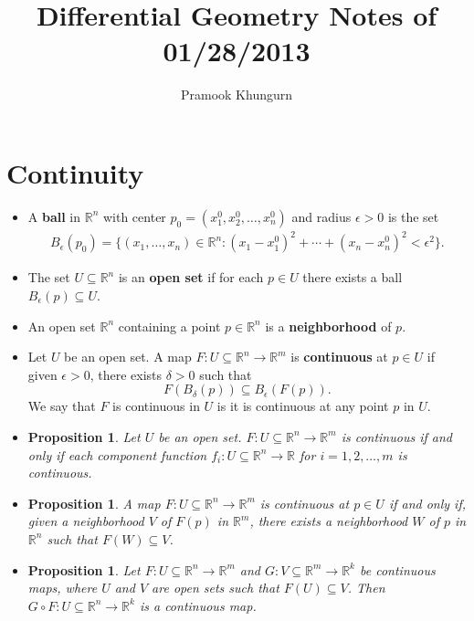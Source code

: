 \documentclass[10pt]{article}
\title{Differential Geometry Notes of 01/28/2013}
\author{Pramook Khungurn}
\newtheorem{proposition}[lemma]{Proposition}
\newcommand{\ra}{\rightarrow}
\newcommand{\Real}{\mathbb{R}}
\begin{document}
	\maketitle

  \section{Continuity} %
  \label{sec:continuity}

  \begin{itemize}
    \item A {\bf ball} in $\Real^n$ with center $p_0 = (x_1^0, x_2^0, \dotsc, x_n^0)$ and radius $\epsilon > 0$ is the set
    \begin{align*}
      B_\epsilon(p_0) = \{ (x_1, \dotsc, x_n) \in \Real^n : (x_1 - x_1^0)^2 + \dotsb + (x_n - x_n^0)^2 < \epsilon^2 \}.
    \end{align*}

    \item The set $U \subseteq \Real^n$ is an {\bf open set} if for each $p \in U$ there exists a ball $B_\epsilon(p) \subseteq U$.

    \item An open set $\Real^n$ containing a point $p \in \Real^n$ is a {\bf neighborhood} of $p$.

    \item Let $U$ be an open set. A map $F : U \subseteq \Real^n \ra \Real^m$ is {\bf continuous} at $p \in U$ if given $\epsilon > 0$, there exists $\delta > 0$ such that $$ F(B_\delta(p)) \subseteq B_\epsilon(F(p)).$$
    We say that $F$ is continuous in $U$ is it is continuous at any point $p$ in $U$.

    \item \begin{proposition}
      Let $U$ be an open set. $F : U \subseteq \Real^n \ra \Real^m$ is continuous if and only if each component function $f_i : U \subseteq \Real^n \ra \Real$ for $i = 1, 2, \dotsc, m$ is continuous.
    \end{proposition}

    \item \begin{proposition}
      A map $F : U \subseteq \Real^n \ra \Real^m$ is continuous at $p \in U$ if and only if, given a neighborhood $V$ of $F(p)$ in $\Real^m$, there exists a neighborhood $W$ of $p$ in $\Real^n$ such that $F(W) \subseteq V$.
    \end{proposition}

    \item \begin{proposition}
      Let $F: U \subseteq \Real^n \ra \Real^m$ and $G:V \subseteq \Real^m \ra \Real^k$ be continuous maps, where $U$ and $V$ are open sets such that $F(U) \subseteq V$. Then $G \circ F: U \subseteq \Real^n \ra \Real^k$ is a continuous map.
    \end{proposition}


\end{itemize}
\end{document}
